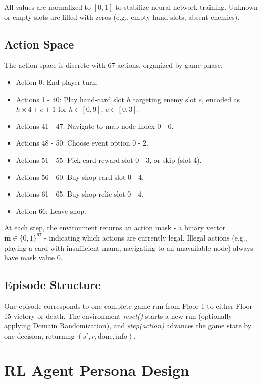 All values are normalized to $[0, 1]$ to stabilize neural network training. Unknown or empty slots are filled with zeros (e.g., empty hand slots, absent enemies).

\subsection{Action Space}

The action space is discrete with 67 actions, organized by game phase:
\begin{itemize}
    \item Action 0: End player turn.
    \item Actions 1 - 40: Play hand-card slot $h$ targeting enemy slot $e$, encoded as $h \times 4 + e + 1$ for $h \in [0,9]$, $e \in [0,3]$.
    \item Actions 41 - 47: Navigate to map node index 0 - 6.
    \item Actions 48 - 50: Choose event option 0 - 2.
    \item Actions 51 - 55: Pick card reward slot 0 - 3, or skip (slot 4).
    \item Actions 56 - 60: Buy shop card slot 0 - 4.
    \item Actions 61 - 65: Buy shop relic slot 0 - 4.
    \item Action 66: Leave shop.
\end{itemize}

At each step, the environment returns an action mask - a binary vector $\mathbf{m} \in \{0,1\}^{67}$ - indicating which actions are currently legal. Illegal actions (e.g., playing a card with insufficient mana, navigating to an unavailable node) always have mask value 0.

\subsection{Episode Structure}

One episode corresponds to one complete game run from Floor 1 to either Floor 15 victory or death. The environment \textit{reset()} starts a new run (optionally applying Domain Randomization), and \textit{step(action)} advances the game state by one decision, returning $(s', r, \text{done}, \text{info})$.

\section{RL Agent Persona Design}
\label{sec:agent_design}

